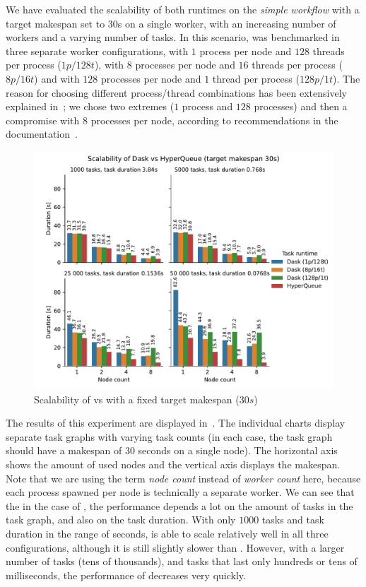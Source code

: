 We have evaluated the scalability of both runtimes on the \emph{simple workflow} with a target
makespan set to $30$s on a single worker, with an increasing number of workers
and a varying number of tasks. In this scenario, \dask{} was benchmarked in three
separate worker configurations, with $1$ process per node and
$128$ threads per process ($1p/128t$), with $8$
processes per node and $16$ threads per process ($8p/16t$) and
with $128$ processes per node and $1$ thread per process
($128p/1t$). The reason for choosing different process/thread combinations has been
extensively explained in~; we chose two extremes ($1$
process and $128$ processes) and then a compromise with $8$
processes per node, according to recommendations in the \dask{}
documentation~\cite{dask-thread-recommendation}.

\begin{figure}[h]
	\centering
	\includegraphics[width=\textwidth]{imgs/hq/charts/dask-vs-hq-sleep}
	\caption{Scalability of \hyperqueue{} vs \dask{} with a fixed target makespan
	($30s$)}
	\label{fig:hq-dask-sleep}
\end{figure}

The results of this experiment are displayed in~. The individual charts
display separate task graphs with varying task counts (in each case, the task graph should have a
makespan of $30$ seconds on a single node). The horizontal axis shows the amount
of used nodes and the vertical axis displays the makespan. Note that we are using the term
\emph{node count} instead of \emph{worker count} here, because each
\dask{} process spawned per node is technically a separate worker. We can see that
the in the case of \dask{}, the performance depends a lot on the amount of tasks in
the task graph, and also on the task duration. With only $1000$ tasks and task
duration in the range of seconds, \dask{} is able to scale relatively well in all
three configurations, although it is still slightly slower than \hyperqueue{}. However,
with a larger number of tasks (tens of thousands), and tasks that last only hundreds or tens of
milliseconds, the performance of \dask{} decreases very quickly.

